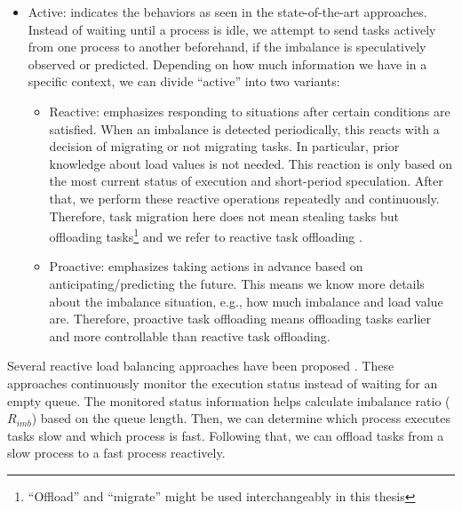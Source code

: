 \begin{itemize}

	\item Active: indicates the behaviors as seen in the state-of-the-art approaches. Instead of waiting until a process is idle, we attempt to send tasks actively from one process to another beforehand, if the imbalance is speculatively observed or predicted. Depending on how much information we have in a specific context, we can divide ``active'' into two variants:
		\begin{itemize}
			\item Reactive: emphasizes responding to situations after certain conditions are satisfied. When an imbalance is detected periodically, this reacts with a decision of migrating or not migrating tasks. In particular, prior knowledge about load values is not needed. This reaction is only based on the most current status of execution and short-period speculation. After that, we perform these reactive operations repeatedly and continuously. Therefore, task migration here does not mean stealing tasks but offloading tasks\footnote{``Offload'' and ``migrate'' might be used interchangeably in this thesis} and we refer to reactive task offloading \cite{klinkenberg2020reactmig}.
			\item Proactive: emphasizes taking actions in advance based on anticipating/predicting the future. This means we know more details about the imbalance situation, e.g., how much imbalance and load value are. Therefore, proactive task offloading means offloading tasks earlier and more controllable than reactive task offloading.
		\end{itemize}
	
\end{itemize}

Several reactive load balancing approaches have been proposed \cite{Klinkenberg2020ChameleonReactLB} \cite{Samfass2021ChameleonReactRepLB}. These approaches continuously monitor the execution status instead of waiting for an empty queue. The monitored status information helps calculate imbalance ratio ($R_{imb}$) based on the queue length. Then, we can determine which process executes tasks slow and which process is fast. Following that, we can offload tasks from a slow process to a fast process reactively.\\


